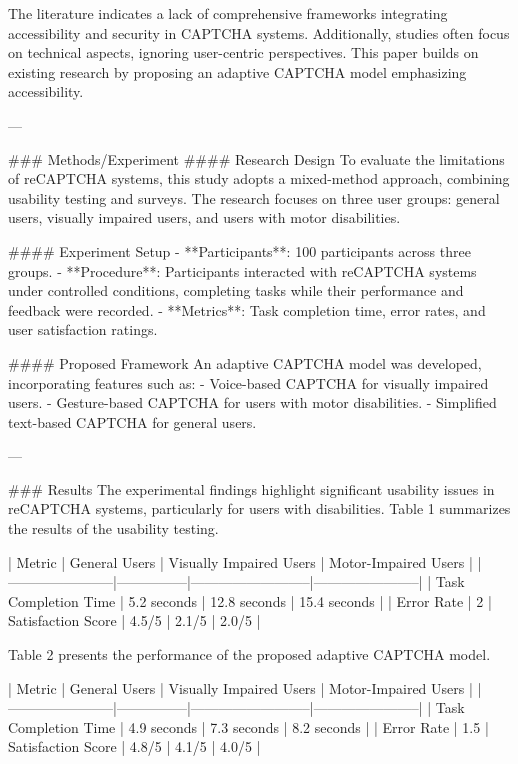 The literature indicates a lack of comprehensive frameworks integrating accessibility and security in CAPTCHA systems. Additionally, studies often focus on technical aspects, ignoring user-centric perspectives. This paper builds on existing research by proposing an adaptive CAPTCHA model emphasizing accessibility.

---

### Methods/Experiment  
#### Research Design  
To evaluate the limitations of reCAPTCHA systems, this study adopts a mixed-method approach, combining usability testing and surveys. The research focuses on three user groups: general users, visually impaired users, and users with motor disabilities.

#### Experiment Setup  
- **Participants**: 100 participants across three groups.
- **Procedure**: Participants interacted with reCAPTCHA systems under controlled conditions, completing tasks while their performance and feedback were recorded.
- **Metrics**: Task completion time, error rates, and user satisfaction ratings.

#### Proposed Framework  
An adaptive CAPTCHA model was developed, incorporating features such as:
- Voice-based CAPTCHA for visually impaired users.
- Gesture-based CAPTCHA for users with motor disabilities.
- Simplified text-based CAPTCHA for general users.

---

### Results  
The experimental findings highlight significant usability issues in reCAPTCHA systems, particularly for users with disabilities. Table 1 summarizes the results of the usability testing.

| Metric                | General Users | Visually Impaired Users | Motor-Impaired Users |  
|-----------------------|---------------|--------------------------|-----------------------|  
| Task Completion Time  | 5.2 seconds   | 12.8 seconds            | 15.4 seconds         |  
| Error Rate            | 2%
| Satisfaction Score    | 4.5/5         | 2.1/5                   | 2.0/5                |  

Table 2 presents the performance of the proposed adaptive CAPTCHA model.

| Metric                | General Users | Visually Impaired Users | Motor-Impaired Users |  
|-----------------------|---------------|--------------------------|-----------------------|  
| Task Completion Time  | 4.9 seconds   | 7.3 seconds             | 8.2 seconds          |  
| Error Rate            | 1.5%
| Satisfaction Score    | 4.8/5         | 4.1/5                   | 4.0/5                |  

